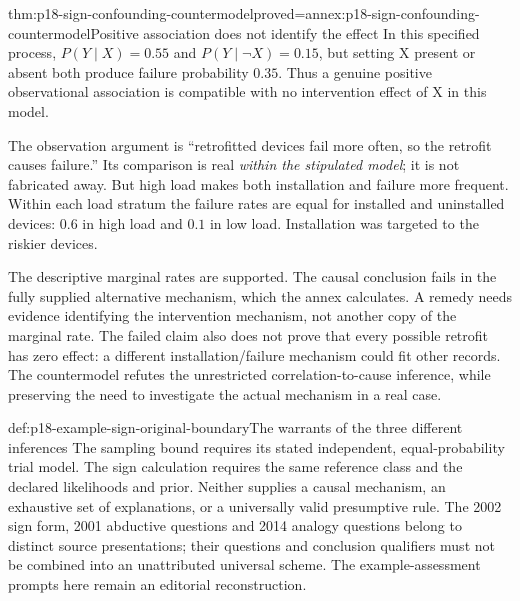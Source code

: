 \begin{hbtheorem}{thm:p18-sign-confounding-countermodel}{proved=annex:p18-sign-confounding-countermodel}{Positive association does not identify the effect}
In this specified process, \(P(Y\mid X)=0.55\) and
\(P(Y\mid\neg X)=0.15\), but setting X present or absent both
produce failure probability \(0.35\). Thus a genuine positive observational
association is compatible with no intervention effect of X in this model.
\end{hbtheorem}

The observation argument is ``retrofitted devices fail more often, so the
retrofit causes failure.'' Its comparison is real \emph{within the stipulated
model}; it is not fabricated away. But high load makes both installation and
failure more frequent. Within each load stratum the failure rates are equal
for installed and uninstalled devices: \(0.6\) in high load and \(0.1\)
in low load. Installation was targeted to the riskier devices.

The descriptive marginal rates are supported. The causal conclusion fails
in the fully supplied alternative mechanism, which the annex calculates.
A remedy needs evidence identifying the intervention mechanism, not another
copy of the marginal rate. The failed claim also does not prove that every
possible retrofit has zero effect: a different installation/failure mechanism
could fit other records. The countermodel refutes the unrestricted
correlation-to-cause inference, while preserving the need to investigate the
actual mechanism in a real case.

\begin{proofboundary}{def:p18-example-sign-original-boundary}{The warrants of the three different inferences}
The sampling bound requires its stated independent, equal-probability
trial model. The sign calculation requires the same reference class and
the declared likelihoods and prior. Neither supplies a causal mechanism,
an exhaustive set of explanations, or a universally valid presumptive rule.
The 2002 sign form, 2001 abductive questions and 2014 analogy questions
belong to distinct source presentations; their questions and conclusion
qualifiers must not be combined into an unattributed universal scheme.
The example-assessment prompts here remain an editorial reconstruction.
\end{proofboundary}
